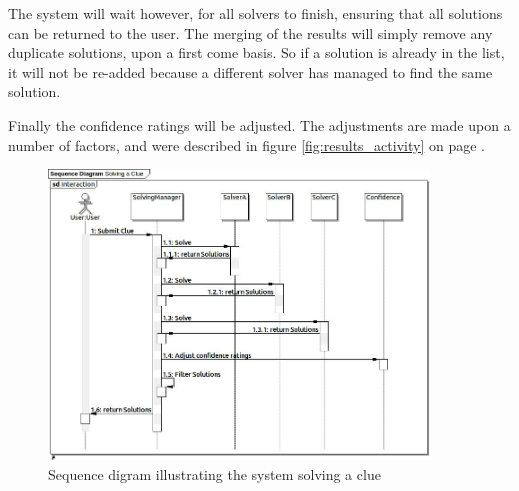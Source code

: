 The system will wait however, for all solvers to finish, ensuring that all 
solutions can be returned to the user. The merging of the results will simply 
remove any duplicate solutions, upon a first come basis. So if a solution is 
already in the list, it will not be re-added because a different solver has 
managed to find the same solution.

Finally the confidence ratings will be adjusted. The adjustments are made upon 
a number of factors, and were described in figure \ref{fig:results_activity} on
page \pageref{fig:results_activity}.

\begin{figure}[H]
  \centering
  \includegraphics[width=0.9\textwidth]{sequence/solving_a_clue.jpg}
  \caption{Sequence digram illustrating the system solving a clue}
  \label{fig:solving_clue_sequence}
\end{figure}
